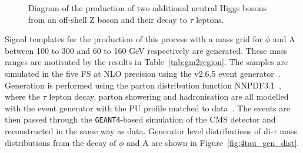 \begin{figure}[H]
\centering
{}
\vspace*{10mm}
\caption[Diagram of the production of two additional neutral Higgs bosons from an off-shell Z boson and their decay to $\tau$ leptons.]{Diagram of the production of two additional neutral Higgs bosons from an off-shell Z boson and their decay to $\tau$ leptons.}
\label{fig:4tau_feynamn}
\end{figure}

Signal templates for the production of this process with a mass grid for $\phi$ and A between 100 to 300 and 60 to 160 GeV respectively are generated.
These mass ranges are motivated by the results in Table~\ref{tab:gm2region}.
The samples are simulated in the five \ac{FS} at \ac{NLO} precision using the \MGvATNLO v2.6.5 event generator~\cite{Alwall:2011uj}.
Generation is performed using the parton distribution function NNPDF3.1~\cite{Ball:2014uwa,Ball:2017nwa}, where the $\tau$ lepton decay, parton showering and hadronisation are all modelled with the \PYTHIA event generator with the \ac{PU} profile matched to data~\cite{Sirunyan:2019dfx,Sjostrand:2014zea}.
The events are then passed through the \texttt{GEANT4}-based \cite{Agostinelli:2002hh} simulation of the \ac{CMS} detector and reconstructed in the same way as data.
Generator level distributions of di-$\tau$ mass distributions from the decay of $\phi$ and A are shown in Figure~\ref{fig:4tau_gen_dist}.\\

